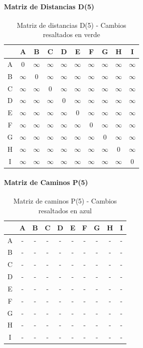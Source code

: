 \documentclass[12pt]{article}
\begin{document}
\paragraph{Matriz de Distancias D(5)}
\begin{table}[h!]
\centering
\begin{tabular}{|c|c|c|c|c|c|c|c|c|c|}
\hline
 & A & B & C & D & E & F & G & H & I \\\hline
A & 0 & $\infty$ & $\infty$ & $\infty$ & $\infty$ & $\infty$ & $\infty$ & $\infty$ & $\infty$ \\\hline
B & $\infty$ & 0 & $\infty$ & $\infty$ & $\infty$ & $\infty$ & $\infty$ & $\infty$ & $\infty$ \\\hline
C & $\infty$ & $\infty$ & 0 & $\infty$ & $\infty$ & $\infty$ & $\infty$ & $\infty$ & $\infty$ \\\hline
D & $\infty$ & $\infty$ & $\infty$ & 0 & $\infty$ & $\infty$ & $\infty$ & $\infty$ & $\infty$ \\\hline
E & $\infty$ & $\infty$ & $\infty$ & $\infty$ & 0 & $\infty$ & $\infty$ & $\infty$ & $\infty$ \\\hline
F & $\infty$ & $\infty$ & $\infty$ & $\infty$ & $\infty$ & 0 & $\infty$ & $\infty$ & $\infty$ \\\hline
G & $\infty$ & $\infty$ & $\infty$ & $\infty$ & $\infty$ & $\infty$ & 0 & $\infty$ & $\infty$ \\\hline
H & $\infty$ & $\infty$ & $\infty$ & $\infty$ & $\infty$ & $\infty$ & $\infty$ & 0 & $\infty$ \\\hline
I & $\infty$ & $\infty$ & $\infty$ & $\infty$ & $\infty$ & $\infty$ & $\infty$ & $\infty$ & 0 \\\hline
\end{tabular}
\caption{Matriz de distancias D(5) - Cambios resaltados en verde}
\end{table}

\paragraph{Matriz de Caminos P(5)}
\begin{table}[h!]
\centering
\begin{tabular}{|c|c|c|c|c|c|c|c|c|c|}
\hline
 & A & B & C & D & E & F & G & H & I \\\hline
A & - & - & - & - & - & - & - & - & - \\\hline
B & - & - & - & - & - & - & - & - & - \\\hline
C & - & - & - & - & - & - & - & - & - \\\hline
D & - & - & - & - & - & - & - & - & - \\\hline
E & - & - & - & - & - & - & - & - & - \\\hline
F & - & - & - & - & - & - & - & - & - \\\hline
G & - & - & - & - & - & - & - & - & - \\\hline
H & - & - & - & - & - & - & - & - & - \\\hline
I & - & - & - & - & - & - & - & - & - \\\hline
\end{tabular}
\caption{Matriz de caminos P(5) - Cambios resaltados en azul}
\end{table}
\end{document}
